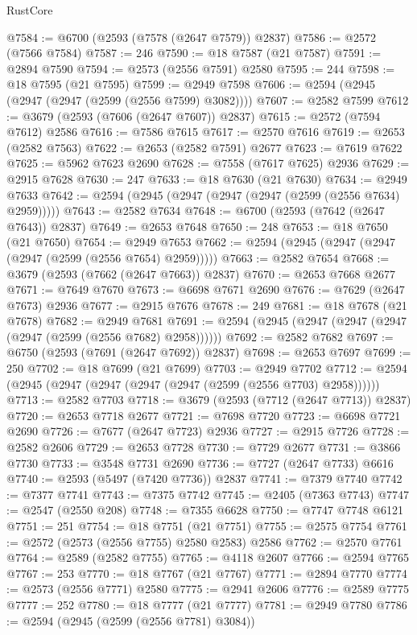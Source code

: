 \begin{lexlean}{RustCore}
\begin{coremodule}
@7584 := @6700 (@2593 (@7578 (@2647 @7579)) @2837)
@7586 := @2572 (@7566 @7584)
@7587 := 246
@7590 := @18 @7587 (@21 @7587)
@7591 := @2894 @7590
@7594 := @2573 (@2556 @7591) @2580
@7595 := 244
@7598 := @18 @7595 (@21 @7595)
@7599 := @2949 @7598
@7606 := @2594 (@2945 (@2947 (@2947 (@2599 (@2556 @7599) @3082))))
@7607 := @2582 @7599
@7612 := @3679 (@2593 (@7606 (@2647 @7607)) @2837)
@7615 := @2572 (@7594 @7612) @2586
@7616 := @7586 @7615
@7617 := @2570 @7616
@7619 := @2653 (@2582 @7563)
@7622 := @2653 (@2582 @7591) @2677
@7623 := @7619 @7622
@7625 := @5962 @7623 @2690
@7628 := @7558 (@7617 @7625) @2936
@7629 := @2915 @7628
@7630 := 247
@7633 := @18 @7630 (@21 @7630)
@7634 := @2949 @7633
@7642 := @2594 (@2945 (@2947 (@2947 (@2947 (@2599 (@2556 @7634) @2959)))))
@7643 := @2582 @7634
@7648 := @6700 (@2593 (@7642 (@2647 @7643)) @2837)
@7649 := @2653 @7648
@7650 := 248
@7653 := @18 @7650 (@21 @7650)
@7654 := @2949 @7653
@7662 := @2594 (@2945 (@2947 (@2947 (@2947 (@2599 (@2556 @7654) @2959)))))
@7663 := @2582 @7654
@7668 := @3679 (@2593 (@7662 (@2647 @7663)) @2837)
@7670 := @2653 @7668 @2677
@7671 := @7649 @7670
@7673 := @6698 @7671 @2690
@7676 := @7629 (@2647 @7673) @2936
@7677 := @2915 @7676
@7678 := 249
@7681 := @18 @7678 (@21 @7678)
@7682 := @2949 @7681
@7691 := @2594 (@2945 (@2947 (@2947 (@2947 (@2947 (@2599 (@2556 @7682) @2958))))))
@7692 := @2582 @7682
@7697 := @6750 (@2593 (@7691 (@2647 @7692)) @2837)
@7698 := @2653 @7697
@7699 := 250
@7702 := @18 @7699 (@21 @7699)
@7703 := @2949 @7702
@7712 := @2594 (@2945 (@2947 (@2947 (@2947 (@2947 (@2599 (@2556 @7703) @2958))))))
@7713 := @2582 @7703
@7718 := @3679 (@2593 (@7712 (@2647 @7713)) @2837)
@7720 := @2653 @7718 @2677
@7721 := @7698 @7720
@7723 := @6698 @7721 @2690
@7726 := @7677 (@2647 @7723) @2936
@7727 := @2915 @7726
@7728 := @2582 @2606
@7729 := @2653 @7728
@7730 := @7729 @2677
@7731 := @3866 @7730
@7733 := @3548 @7731 @2690
@7736 := @7727 (@2647 @7733) @6616
@7740 := @2593 (@5497 (@7420 @7736)) @2837
@7741 := @7379 @7740
@7742 := @7377 @7741
@7743 := @7375 @7742
@7745 := @2405 (@7363 @7743)
@7747 := @2547 (@2550 @208)
@7748 := @7355 @6628
@7750 := @7747 @7748 @6121
@7751 := 251
@7754 := @18 @7751 (@21 @7751)
@7755 := @2575 @7754
@7761 := @2572 (@2573 (@2556 @7755) @2580 @2583) @2586
@7762 := @2570 @7761
@7764 := @2589 (@2582 @7755)
@7765 := @4118 @2607
@7766 := @2594 @7765
@7767 := 253
@7770 := @18 @7767 (@21 @7767)
@7771 := @2894 @7770
@7774 := @2573 (@2556 @7771) @2580
@7775 := @2941 @2606
@7776 := @2589 @7775
@7777 := 252
@7780 := @18 @7777 (@21 @7777)
@7781 := @2949 @7780
@7786 := @2594 (@2945 (@2599 (@2556 @7781) @3084))

\end{coremodule}
\end{lexlean}
